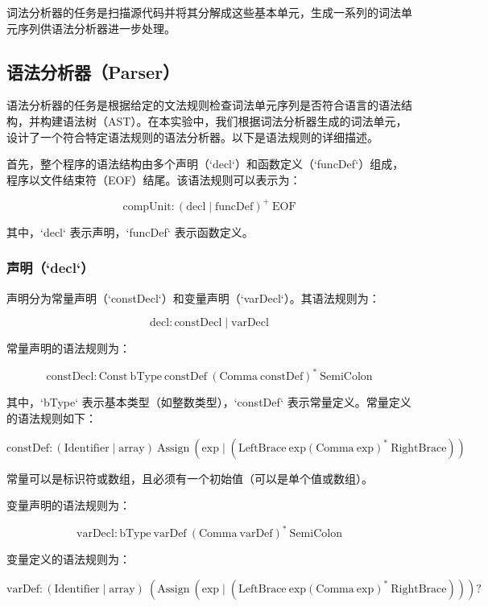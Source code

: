 \documentclass[../main.tex]{subfiles}
\begin{document}
词法分析器的任务是扫描源代码并将其分解成这些基本单元，生成一系列的词法单元序列供语法分析器进一步处理。

\subsection{语法分析器（Parser）}

语法分析器的任务是根据给定的文法规则检查词法单元序列是否符合语言的语法结构，并构建语法树（AST）。在本实验中，我们根据词法分析器生成的词法单元，设计了一个符合特定语法规则的语法分析器。以下是语法规则的详细描述。

首先，整个程序的语法结构由多个声明（`decl`）和函数定义（`funcDef`）组成，程序以文件结束符（EOF）结尾。该语法规则可以表示为：

\[
\text{compUnit} \colon (\text{decl} \mid \text{funcDef})^+ \ \text{EOF}
\]

其中，`decl` 表示声明，`funcDef` 表示函数定义。

\subsubsection*{声明（`decl`）}

声明分为常量声明（`constDecl`）和变量声明（`varDecl`）。其语法规则为：

\[
\text{decl} \colon \text{constDecl} \mid \text{varDecl}
\]

常量声明的语法规则为：

\[
\text{constDecl} \colon \text{Const} \ \text{bType} \ \text{constDef} \ (\text{Comma} \ \text{constDef})^* \ \text{SemiColon}
\]

其中，`bType` 表示基本类型（如整数类型），`constDef` 表示常量定义。常量定义的语法规则如下：

\[
\text{constDef} \colon (\text{Identifier} \mid \text{array}) \ \text{Assign} \ (\text{exp} \mid (\text{LeftBrace} \ \text{exp} (\text{Comma} \ \text{exp})^* \ \text{RightBrace}))
\]

常量可以是标识符或数组，且必须有一个初始值（可以是单个值或数组）。

变量声明的语法规则为：

\[
\text{varDecl} \colon \text{bType} \ \text{varDef} \ (\text{Comma} \ \text{varDef})^* \ \text{SemiColon}
\]

变量定义的语法规则为：

\[
\text{varDef} \colon (\text{Identifier} \mid \text{array}) \ (\text{Assign} \ (\text{exp} \mid (\text{LeftBrace} \ \text{exp} (\text{Comma} \ \text{exp})^* \ \text{RightBrace})) )?
\]
\end{document}
